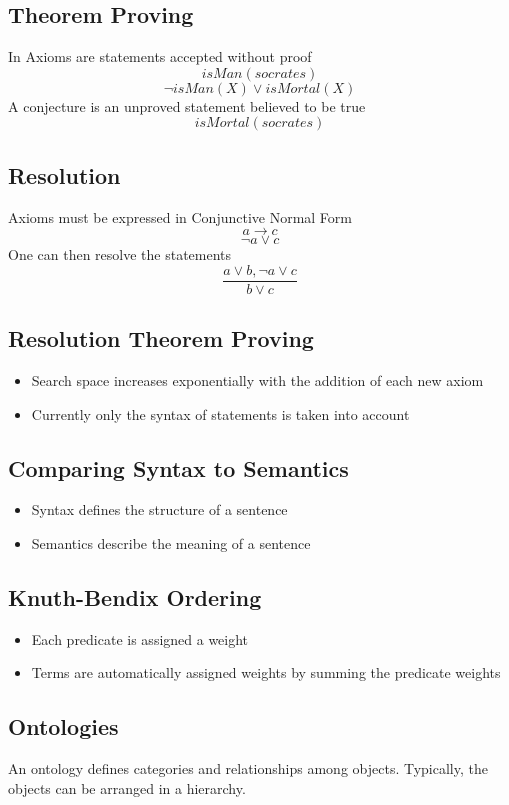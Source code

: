 \documentclass{article}
\begin{document}
\subsection{Theorem Proving}
In Axioms are statements accepted without proof
        \[isMan(socrates)\]
        \[\lnot isMan(X)\lor isMortal(X)\]
	    A conjecture is an unproved statement believed to be true 
	    \[isMortal(socrates)\]
	

	\subsection{Resolution}
		Axioms must be expressed in Conjunctive Normal Form
		\[a \rightarrow c\]
		\[\lnot a \lor c\]
		One can then resolve the statements
		\[\frac{a \lor b, \lnot a \lor c }{b \lor c}\]
	
	\subsection{Resolution Theorem Proving}
        \begin{itemize}
            \item Search space increases exponentially with the addition of each new axiom
            \item Currently only the syntax of statements is taken into account
        \end{itemize}
	
	\subsection{Comparing Syntax to Semantics}
		\begin{itemize}
		    \item Syntax defines the structure of a sentence
		    \item Semantics describe the meaning of a sentence
		\end{itemize}
	
	\subsection{Knuth-Bendix Ordering}
		\begin{itemize}
		    \item Each predicate is assigned a weight
		    \item Terms are automatically assigned weights by summing the predicate weights
		\end{itemize}
	
	\subsection{Ontologies}
		An ontology defines categories and relationships among objects. Typically, the objects can be arranged in a hierarchy. 
\end{document}

